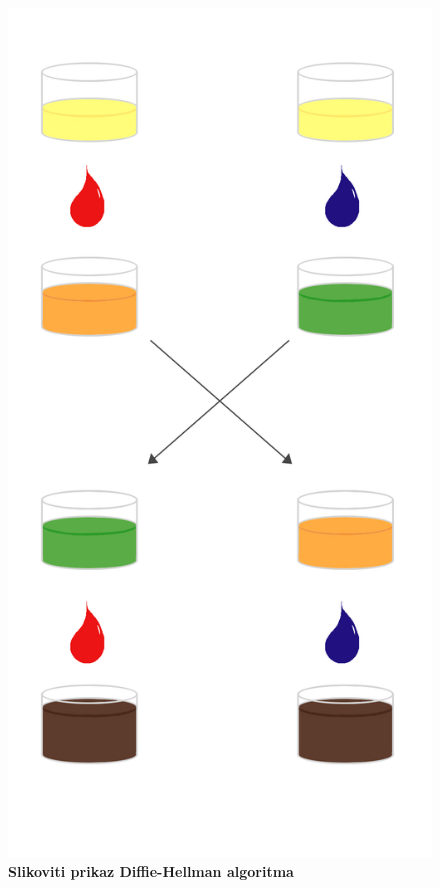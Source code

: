 \documentclass[a4paper]{article}
\begin{document}
\begin{figure}
\centering
\includegraphics{Boje.jpg}
\caption{\textbf{Slikoviti prikaz Diffie-Hellman algoritma}}
\label{slika:boje}
\end{figure}
\end{document}

